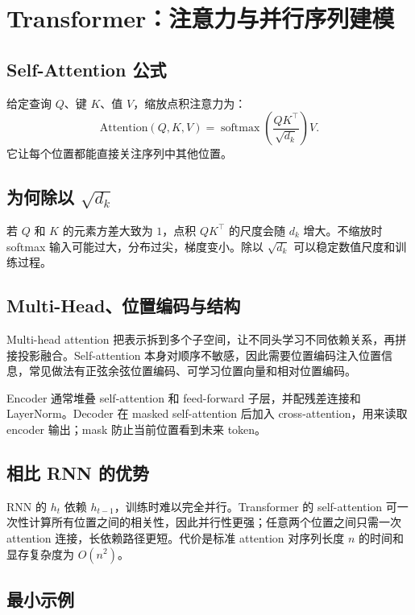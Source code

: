 \section{Transformer：注意力与并行序列建模}

\subsection{Self-Attention 公式}

给定查询 \(Q\)、键 \(K\)、值 \(V\)，缩放点积注意力为：
\[
\mathrm{Attention}(Q,K,V)=\operatorname{softmax}\left(\frac{QK^\top}{\sqrt{d_k}}\right)V.
\]
它让每个位置都能直接关注序列中其他位置。

\subsection{为何除以 \(\sqrt{d_k}\)}

若 \(Q\) 和 \(K\) 的元素方差大致为 \(1\)，点积 \(QK^\top\) 的尺度会随 \(d_k\) 增大。不缩放时 softmax 输入可能过大，分布过尖，梯度变小。除以 \(\sqrt{d_k}\) 可以稳定数值尺度和训练过程。

\subsection{Multi-Head、位置编码与结构}

Multi-head attention 把表示拆到多个子空间，让不同头学习不同依赖关系，再拼接投影融合。Self-attention 本身对顺序不敏感，因此需要位置编码注入位置信息，常见做法有正弦余弦位置编码、可学习位置向量和相对位置编码。

Encoder 通常堆叠 self-attention 和 feed-forward 子层，并配残差连接和 LayerNorm。Decoder 在 masked self-attention 后加入 cross-attention，用来读取 encoder 输出；mask 防止当前位置看到未来 token。

\subsection{相比 RNN 的优势}

RNN 的 \(h_t\) 依赖 \(h_{t-1}\)，训练时难以完全并行。Transformer 的 self-attention 可一次性计算所有位置之间的相关性，因此并行性更强；任意两个位置之间只需一次 attention 连接，长依赖路径更短。代价是标准 attention 对序列长度 \(n\) 的时间和显存复杂度为 \(O(n^2)\)。

\subsection{ 最小示例}

